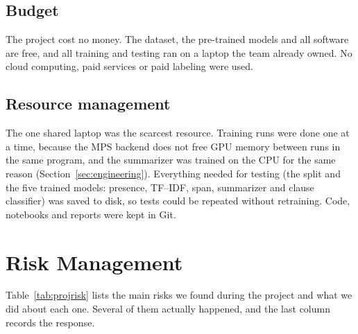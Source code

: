 \subsection{Budget}
The project cost no money. The dataset, the pre-trained models and all software are free, and all training and testing ran on a laptop the team already owned. No cloud computing, paid services or paid labeling were used.

\subsection{Resource management}
The one shared laptop was the scarcest resource. Training runs were done one at a time, because the MPS backend does not free GPU memory between runs in the same program, and the summarizer was trained on the CPU for the same reason (Section~\ref{sec:engineering}). Everything needed for testing (the split and the five trained models: presence, TF--IDF, span, summarizer and clause classifier) was saved to disk, so tests could be repeated without retraining. Code, notebooks and reports were kept in Git.

\section{Risk Management}
Table~\ref{tab:projrisk} lists the main risks we found during the project and what we did about each one. Several of them actually happened, and the last column records the response.

